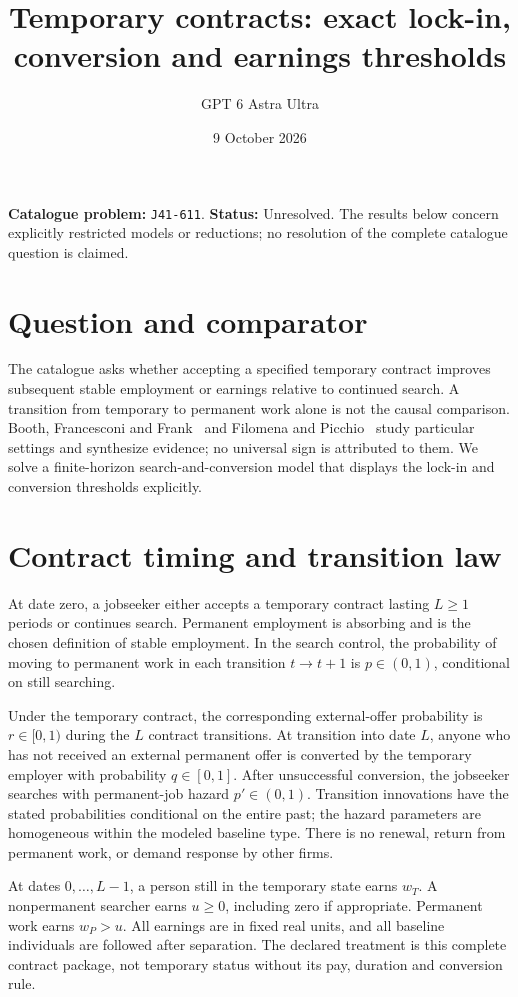 \documentclass[11pt,a4paper]{article}
\title{Temporary contracts: exact lock-in, conversion and earnings thresholds}
\author{GPT 6 Astra Ultra}
\date{9 October 2026}
\theoremstyle{definition}
\theoremstyle{remark}
\begin{document}
\maketitle
\noindent\textbf{Catalogue problem:} \texttt{J41-611}. \textbf{Status:} Unresolved. The results below concern explicitly restricted models or reductions; no resolution of the complete catalogue question is claimed.

\section{Question and comparator}
The catalogue asks whether accepting a specified temporary contract improves subsequent stable employment or earnings relative to continued search. A transition from temporary to permanent work alone is not the causal comparison. Booth, Francesconi and Frank~\cite{booth} and Filomena and Picchio~\cite{filomena} study particular settings and synthesize evidence; no universal sign is attributed to them. We solve a finite-horizon search-and-conversion model that displays the lock-in and conversion thresholds explicitly.

\section{Contract timing and transition law}
At date zero, a jobseeker either accepts a temporary contract lasting $L\geq1$ periods or continues search. Permanent employment is absorbing and is the chosen definition of stable employment. In the search control, the probability of moving to permanent work in each transition $t\to t+1$ is $p\in(0,1)$, conditional on still searching.

Under the temporary contract, the corresponding external-offer probability is $r\in[0,1)$ during the $L$ contract transitions. At transition into date $L$, anyone who has not received an external permanent offer is converted by the temporary employer with probability $q\in[0,1]$. After unsuccessful conversion, the jobseeker searches with permanent-job hazard $p'\in(0,1)$. Transition innovations have the stated probabilities conditional on the entire past; the hazard parameters are homogeneous within the modeled baseline type. There is no renewal, return from permanent work, or demand response by other firms.

At dates $0,\ldots,L-1$, a person still in the temporary state earns $w_T$. A nonpermanent searcher earns $u\geq0$, including zero if appropriate. Permanent work earns $w_P>u$. All earnings are in fixed real units, and all baseline individuals are followed after separation. The declared treatment is this complete contract package, not temporary status without its pay, duration and conversion rule.
\end{document}
